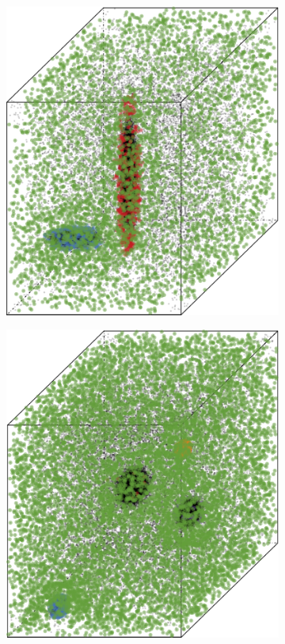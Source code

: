\begin{figure}
\begin{subfigure}{0.23\textwidth}
				\includegraphics[keepaspectratio=true, width=\textwidth, height=0.23\textheight]{discussion/img/baakman_2_60000_anisotropy.png}
				\caption{}
				\label{fig:discussion:anisotropy:baakman2}
			\end{subfigure}	
			\subfigvspace
			\begin{subfigure}{0.23\textwidth}
				\centering
				\includegraphics[keepaspectratio=true, width=\textwidth, height=0.23\textheight]{discussion/img/ferdosi_3_120000_anisotropy.png}

\end{subfigure}
\end{figure}
